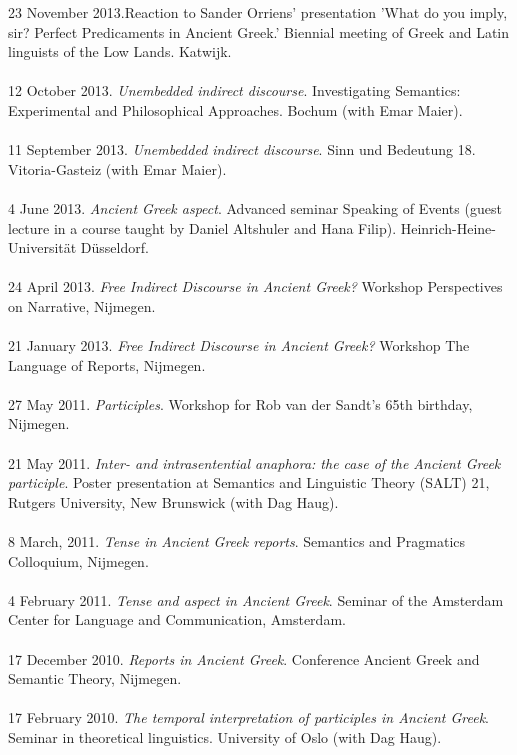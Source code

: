 \documentclass[a4paper,11pt]{article}
\begin{document}
23 November 2013.Reaction to Sander Orriens' presentation 'What do you imply, sir? Perfect Predicaments in Ancient Greek.' Biennial meeting of Greek and Latin linguists of the Low Lands. Katwijk.\\\\
12 October 2013. \emph{Unembedded indirect discourse}. Investigating Semantics: Experimental and Philosophical Approaches. Bochum (with Emar Maier).\\\\ 
11 September 2013. \emph{Unembedded indirect discourse}. Sinn und Bedeutung 18. Vitoria-Gasteiz (with Emar Maier). \\\\
4 June 2013. \emph{Ancient Greek aspect}. Advanced seminar Speaking of Events (guest lecture in a course taught by Daniel Altshuler and Hana Filip). Heinrich-Heine-Universit\"at D\"usseldorf.\\\\ 
24 April 2013. \emph{Free Indirect Discourse in Ancient Greek?} Workshop Perspectives on Narrative, Nijmegen.\\\\
21 January 2013. \emph{Free Indirect Discourse in Ancient Greek?} Workshop The Language of Reports, Nijmegen.\\\\
27 May 2011. \emph{Participles}. Workshop for Rob van der Sandt's 65th birthday, Nijmegen.\\\\
21 May 2011. \emph{Inter- and intrasentential anaphora: the case of the Ancient Greek participle}. Poster presentation at Semantics and Linguistic Theory (SALT) 21, Rutgers University, New Brunswick (with Dag Haug).\\\\
8 March, 2011. \emph{Tense in Ancient Greek reports}. Semantics and Pragmatics Colloquium, Nijmegen.\\\\
4 February 2011. \emph{Tense and aspect in Ancient Greek}. Seminar of the Amsterdam Center for Language and Communication, Amsterdam.\\\\
17 December 2010. \emph{Reports in Ancient Greek}. Conference Ancient Greek and Semantic Theory, Nijmegen.\\\\ 
17 February 2010. \emph{The temporal interpretation of participles in Ancient Greek}.
Seminar in theoretical linguistics. University of Oslo (with Dag Haug).\\\\
\end{document}
